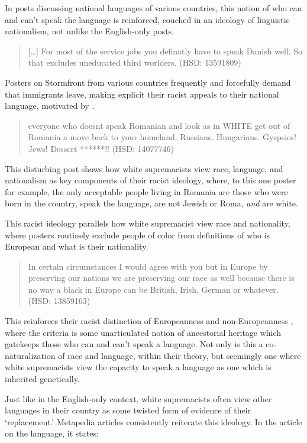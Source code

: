 \documentclass[output=paper,colorlinks,citecolor=brown]{langscibook}
\begin{document}
In posts discussing national languages of various countries, this notion of who can and can't speak the language is reinforced, couched in an ideology of linguistic nationalism, not unlike the English-only posts.

\begin{quote}
{[}\ldots{]} For most of the service jobs you definatly have to speak Danish well. So that excludes uneducated third worlders. (HSD: 13591809) 
\end{quote}

Posters on Stormfront from various countries frequently and forcefully demand that immigrants leave, making explicit their racist appeals to their national language, motivated by .

\begin{quote} 
everyone who doesnt speak Romanian and look as in WHITE get out of Romania a move back to your homeland. Russians. Hungarians. Gyspsies! Jews! Dessert ******!! (HSD: 14077746) 
\end{quote}

\noindent This disturbing post shows how white supremacists view race, language, and nationalism as key components of their racist ideology, where, to this one poster for example, the only acceptable people living in Romania are those who were born in the country, speak the language, are not Jewish or Roma, \emph{and} are white.

This racist ideology parallels how white supremacist view race and nationality, where posters routinely exclude people of color from definitions of who is European and what is their nationality.

\begin{quote} 
In certain circumstances I would agree with you but in Europe by preserving our nations we are preserving our race as well because there is no way a black in Europe can be British, Irish, German or whatever. (HSD: 13859163) 
\end{quote}

\noindent This reinforces their racist distinction of Europeanness and non-Europeanness \citep{jp:RosaFlores2017}, where the criteria is some unarticulated notion of ancestorial heritage which gatekeeps those who can and can't speak a language. Not only is this a co\hyp naturalization of race and language, within their theory, but seemingly one where white supremacists view the capacity to speak a language as one which is inherited genetically.

Just like in the English-only context, white supremacists often view other languages in their country as some twisted form of evidence of their `replacement.' Metapedia articles consistently reiterate this ideology. In the article on the  language, it states:
\end{document}
